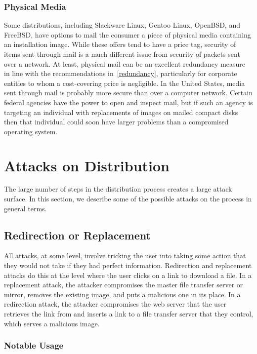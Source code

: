 \documentclass[conference]{IEEEtran}
\begin{document}
\subsubsection{Physical Media}

Some distributions, including Slackware Linux, Gentoo Linux, OpenBSD, and FreeBSD,
have options to mail the consumer a piece of physical media containing an installation
image. While these offers tend to have a price tag, security of items sent through mail
is a much different issue from security of packets sent over a network. At least, physical
mail can be an excellent redundancy measure in line with the recommendations
in~\ref{redundancy}, particularly for corporate entities to whom a cost-covering price is
negligible. In the United States, media sent through mail is probably more secure
than over a computer network. Certain federal agencies have the power to open and inspect
mail, but if such an agency is targeting an individual with replacements of images on
mailed compact disks then that individual could soon have larger problems than a
compromised operating system.

\section{Attacks on Distribution}

The large number of steps in the distribution process creates a large attack surface. In this
section, we describe some of the possible attacks on the process in general terms.

\subsection{Redirection or Replacement}

All attacks, at some level, involve tricking the user into taking some action that they would
not take if they had perfect information. Redirection and replacement attacks do this at the
level where the user clicks on a link to download a file. In a replacement attack, the attacker
compromises the master file transfer server or mirror, removes the existing image, and puts a
malicious one in its place. In a redirection attack, the attacker compromises the web server
that the user retrieves the link from and inserts a link to a file transfer server that they
control, which serves a malicious image.

\subsubsection{Notable Usage}
\end{document}
